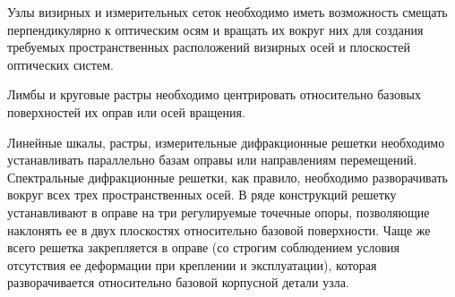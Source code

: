 Узлы визирных и измерительных сеток необходимо иметь возможность смещать перпендикулярно к оптическим осям и вращать их вокруг них для создания требуемых пространственных расположений визирных осей и плоскостей оптических систем.

Лимбы и круговые растры необходимо центрировать относительно базовых поверхностей их оправ или осей вращения.

Линейные шкалы, растры, измерительные дифракционные решетки необходимо устанавливать параллельно базам оправы или направлениям перемещений.
Спектральные дифракционные решетки, как правило, необходимо разворачивать вокруг всех трех пространственных осей. 
В ряде конструкций решетку устанавливают в оправе на три регулируемые точечные опоры, позволяющие наклонять ее в двух плоскостях относительно базовой поверхности.
Чаще же всего решетка закрепляется в оправе (со строгим соблюдением условия отсутствия ее деформации при креплении и эксплуатации), которая разворачивается относительно базовой корпусной детали узла.
